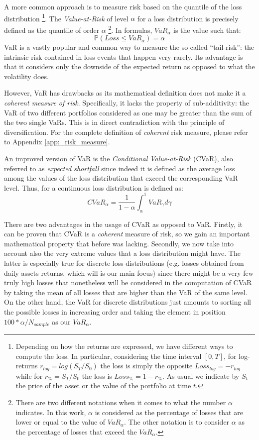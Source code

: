 A more common approach is to measure risk based on the quantile of the loss distribution \footnote{Depending on how the returns are expressed, we have different ways to compute the loss. In particular, considering the time interval $[0, T]$, for log-returns $r_{log}=log(S_T/S_0)$ the loss is simply the opposite $Loss_{log} = - r_{log}$ while for $r_\% = S_T/S_0$  the loss is $Loss_\% = 1 - r_\%$. As usual we indicate by $S_t$ the price  of the asset or the value of the portfolio at time $t$.}. The \textit{Value-at-Risk} of level $\alpha$ for a loss distribution is precisely defined as the quantile of order $\alpha$ \footnote{ There are two different notations when it comes to what the number $\alpha$ indicates. In this work, $\alpha$ is considered as the percentage of losses that are lower or equal to the value of $VaR_\alpha$. The other notation is to consider $\alpha$ as the percentage of losses that exceed the $VaR_\alpha$. }.  In formulas, $VaR_\alpha$ is the value such that:
\begin{equation}
\mathbb{P}(Loss \leq VaR_\alpha) = \alpha
\end{equation}
VaR is a vastly popular and common way to measure the so called ``tail-risk'': the intrinsic risk contained in loss events that happen very rarely. 
Its advantage is that it considers only the downside of the expected return as opposed to what the volatility does.

However, VaR has drawbacks as its mathematical definition does not make it a \textit{coherent measure of risk}. Specifically, it lacks the property of sub-additivity: the VaR of two different portfolios  considered as one may be greater than the sum of the two single VaRs. This is in direct contradiction with the principle of diversification.
For the complete definition of \textit{coherent} risk measure, please refer to Appendix \ref{app:_risk_measure}.

\bigskip
An improved version of VaR is the \textit{Conditional Value-at-Risk} (CVaR), also referred to as \textit{expected shortfall} since indeed it is defined as the average loss among the values of the loss distribution that exceed the corresponding VaR level. Thus, for a continuous loss distribution is defined as:
\begin{equation}
	CVaR_\alpha = \frac{1}{1-\alpha} \int_{\alpha}^{1} VaR_\gamma d\gamma 
\end{equation}

There are two advantages in the usage of CVaR as opposed to VaR. Firstly, it can be proven that CVaR is a \textit{coherent} measure of risk, so we gain an important mathematical property that before was lacking. Secondly, we now take into account also the very extreme values that a loss distribution might have. The latter is especially true for discrete loss distributions (e.g. losses obtained from daily assets returns, which will is our main focus) since there might be a very few  truly high losses that nonetheless will be considered in the computation of CVaR by taking the mean of all losses that are higher than the VaR of the same level. On the other hand, the VaR for discrete distributions just amounts to sorting all the possible losses in increasing order and taking the element in position $100*\alpha / N_{sample}$ as our $VaR_\alpha$. 

